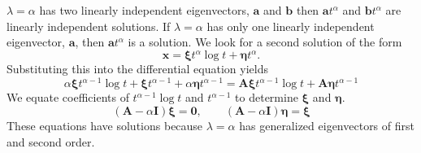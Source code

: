 {\begin{Solution}
\begin{enumerate}
    $\lambda = \alpha$ has two linearly independent eigenvectors,
    $\mathbf{a}$ and $\mathbf{b}$ then $\mathbf{a} t^\alpha$ and $\mathbf{b} t^\alpha$ are linearly
    independent solutions.  If $\lambda = \alpha$ has only one linearly
    independent eigenvector, $\mathbf{a}$, then $\mathbf{a} t^\alpha$ is a solution.
    We look for a second solution of the form
    \[
    \mathbf{x} = \boldsymbol{\xi} t^\alpha \log t + \boldsymbol{\eta} t^\alpha.
    \]
    Substituting this into the differential equation yields
    \[
    \alpha \boldsymbol{\xi} t^{\alpha-1} \log t + \boldsymbol{\xi} t^{\alpha-1} 
    + \alpha \boldsymbol{\eta} t^{\alpha-1} = \mathbf{A} \boldsymbol{\xi} t^{\alpha-1} \log t
    + \mathbf{A} \boldsymbol{\eta} t^{\alpha-1}
    \]
    We equate coefficients of $t^{\alpha-1} \log t$ and $t^{\alpha-1}$ to 
    determine $\boldsymbol{\xi}$ and $\boldsymbol{\eta}$.
    \[
    (\mathbf{A} - \alpha \mathbf{I}) \boldsymbol{\xi} = \mathbf{0}, \qquad
    (\mathbf{A} - \alpha \mathbf{I}) \boldsymbol{\eta} = \boldsymbol{\xi}
    \]
    These equations have solutions because $\lambda = \alpha$ has generalized
    eigenvectors of first and second order.


\end{enumerate}
\end{Solution}}
